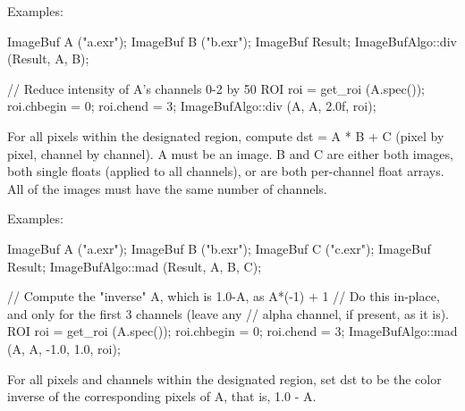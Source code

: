 \smallskip
\noindent Examples:
\begin{code}
    ImageBuf A ("a.exr");
    ImageBuf B ("b.exr");
    ImageBuf Result;
    ImageBufAlgo::div (Result, A, B);

    // Reduce intensity of A's channels 0-2 by 50%
    ROI roi = get_roi (A.spec());
    roi.chbegin = 0;  roi.chend = 3;
    ImageBufAlgo::div (A, A, 2.0f, roi);
\end{code}
\apiend


 

For all pixels within the designated region, compute {\cf dst = A * B + C}
(pixel by pixel, channel by channel). {\cf A} must be an image. {\cf B} and
{\cf C} are either both images, both single floats (applied to all
channels), or are both per-channel float arrays. All of the images must have
the same number of channels.

\smallskip
\noindent Examples:
\begin{code}
    ImageBuf A ("a.exr");
    ImageBuf B ("b.exr");
    ImageBuf C ("c.exr");
    ImageBuf Result;
    ImageBufAlgo::mad (Result, A, B, C);

    // Compute the "inverse" A, which is 1.0-A, as A*(-1) + 1
    // Do this in-place, and only for the first 3 channels (leave any
    // alpha channel, if present, as it is).
    ROI roi = get_roi (A.spec());
    roi.chbegin = 0;  roi.chend = 3;
    ImageBufAlgo::mad (A, A, -1.0, 1.0, roi);
\end{code}
\apiend


 

For all pixels and channels within the designated region, set {\cf dst}
to be the color inverse of the corresponding pixels of {\cf A}, that is,
1.0 - A.

